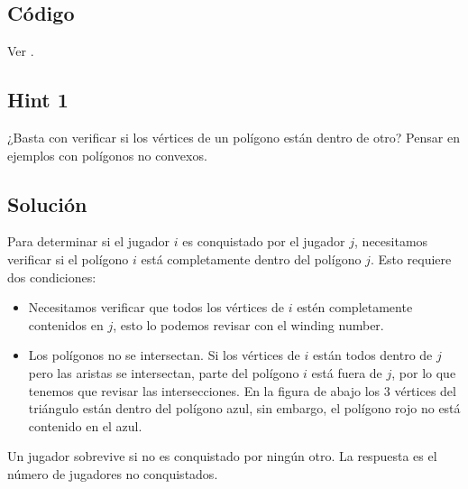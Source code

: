 \subsection*{Código}
Ver .

\subsection*{Hint 1}
¿Basta con verificar si los vértices de un polígono están dentro de otro? Pensar en ejemplos con polígonos no convexos.
\subsection*{Solución}
Para determinar si el jugador $i$ es conquistado por el jugador $j$,
necesitamos verificar si el polígono $i$ está completamente
dentro del polígono $j$. Esto requiere dos condiciones:
\begin{itemize}
    \item Necesitamos verificar que todos los vértices de $i$ estén completamente contenidos en $j$, esto lo podemos revisar con el winding number.
    \item Los polígonos no se intersectan. Si los vértices de $i$ están todos dentro de $j$ pero las aristas se intersectan, parte del polígono $i$ está fuera de $j$, por lo que tenemos que revisar las intersecciones. En la figura de abajo los $3$ vértices del triángulo están dentro del polígono azul, sin embargo, el polígono rojo no está contenido en el azul.
\end{itemize}
 
\begin{figure}[H]
\centering
{}
\end{figure}
Un jugador sobrevive si no es conquistado por ningún otro. La
respuesta es el número de jugadores no conquistados.

